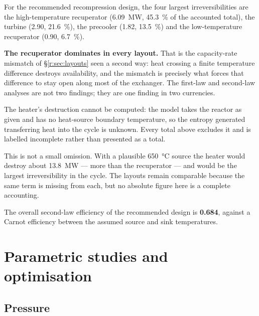 For the recommended recompression design, the four largest
irreversibilities are the high-temperature recuperator
(\SI{6.09}{\mega\watt}, \SI{45.3}{\percent} of the accounted total), the
turbine (\SI{2.90}{}, \SI{21.6}{\percent}), the precooler
(\SI{1.82}{}, \SI{13.5}{\percent}) and the low-temperature recuperator
(\SI{0.90}{}, \SI{6.7}{\percent}).

\textbf{The recuperator dominates in every layout.} That is the
capacity-rate mismatch of \S\ref{r:sec:layouts} seen a second way: heat
crossing a finite temperature difference destroys availability, and the
mismatch is precisely what forces that difference to stay open along
most of the exchanger. The first-law and second-law analyses are not
two findings; they are one finding in two currencies.

\begin{caveat}[title={The totals are incomplete, and say so}]
The heater's destruction cannot be computed: the model takes the
reactor as given and has no heat-source boundary temperature, so the
entropy generated transferring heat into the cycle is unknown. Every
total above excludes it and is labelled incomplete rather than
presented as a total.

This is not a small omission. With a plausible \SI{650}{\celsius}
source the heater would destroy about \SI{13.8}{\mega\watt} --- more
than the recuperator --- and would be the largest irreversibility in the
cycle. The layouts remain comparable because the same term is missing
from each, but no absolute figure here is a complete accounting.
\end{caveat}

The overall second-law efficiency of the recommended design is
\textbf{\num{0.684}}, against a Carnot efficiency between the assumed
source and sink temperatures.

\section{Parametric studies and optimisation}

\subsection{Pressure}

